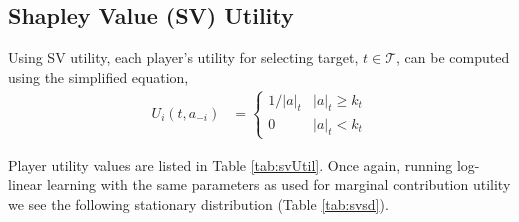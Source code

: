 \documentclass[defaultstyle,12pt]{proposal}
\def\Ta{\mathcal{T}}  %
\begin{document}
\subsection{Shapley Value (SV) Utility}
Using SV utility, each player's utility for selecting target, $t \in \Ta$, can be computed using the simplified equation,
\begin{align}
	U_i(t, a_{-i}) & = \left\{
		\begin{array}{ll}	
			1/|a|_t & |a|_t \geq k_t\\
			0 & |a|_t < k_t
		\end{array}\right.
\end{align}

Player utility values are listed in Table \ref{tab:svUtil}. Once again, running log-linear learning with the same parameters as used for marginal contribution utility we see the following stationary distribution (Table \ref{tab:svsd}).
\end{document}
